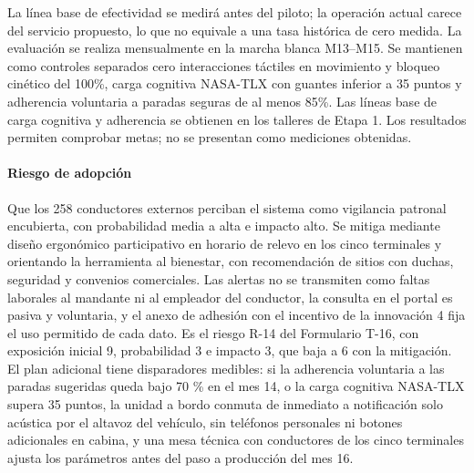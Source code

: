 La línea base de efectividad se medirá antes del piloto; la operación actual carece del servicio propuesto, lo que no equivale a una tasa histórica de cero medida. La evaluación se realiza mensualmente en la marcha blanca M13--M15. Se mantienen como controles separados cero interacciones táctiles en movimiento y bloqueo cinético del 100\%, carga cognitiva NASA-TLX con guantes inferior a 35 puntos y adherencia voluntaria a paradas seguras de al menos 85\%. Las líneas base de carga cognitiva y adherencia se obtienen en los talleres de Etapa 1. Los resultados permiten comprobar metas; no se presentan como mediciones obtenidas.

\paragraph{Riesgo de adopción} Que los 258 conductores externos perciban el sistema como vigilancia
patronal encubierta, con probabilidad media a alta e impacto alto. Se mitiga mediante diseño
ergonómico participativo en horario de relevo en los cinco terminales y orientando la herramienta al
bienestar, con recomendación de sitios con duchas, seguridad y convenios comerciales. Las alertas no
se transmiten como faltas laborales al mandante ni al empleador del conductor, la consulta en el
portal es pasiva y voluntaria, y el anexo de adhesión con el incentivo de la innovación 4 fija el uso
permitido de cada dato. Es el riesgo R-14 del Formulario T-16, con exposición inicial 9, probabilidad 3
e impacto 3, que baja a 6 con la mitigación. El plan adicional tiene disparadores medibles: si la
adherencia voluntaria a las paradas sugeridas queda bajo 70 \% en el mes 14, o la carga cognitiva
NASA-TLX supera 35 puntos, la unidad a bordo conmuta de inmediato a notificación solo acústica por el
altavoz del vehículo, sin teléfonos personales ni botones adicionales en cabina, y una mesa técnica
con conductores de los cinco terminales ajusta los parámetros antes del paso a producción del mes 16.

